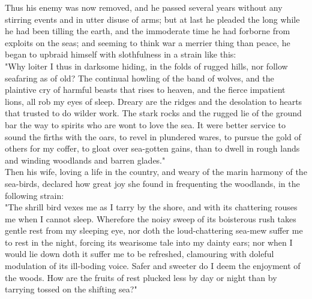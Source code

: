 \documentclass[10pt,a4paper]{report}
\begin{document}
Thus his enemy was now removed, and he passed several years without any stirring events and in utter disuse of arms; but at last he pleaded the long while he had been tilling the earth, and the immoderate time he had forborne from exploits on the seas; and seeming to think war a merrier thing than peace, he began to upbraid himself with slothfulness in a strain like this:\\

"Why loiter I thus in darksome hiding, in the folds of rugged hills, nor follow seafaring as of old? The continual howling of the band of wolves, and the plaintive cry of harmful beasts that rises to heaven, and the fierce impatient lions, all rob my eyes of sleep. Dreary are the ridges and the desolation to hearts that trusted to do wilder work. The stark rocks and the rugged lie of the ground bar the way to spirits who are wont to love the sea. It were better service to sound the firths with the oars, to revel in plundered wares, to pursue the gold of others for my coffer, to gloat over sea-gotten gains, than to dwell in rough lands and winding woodlands and barren glades."\\

Then his wife, loving a life in the country, and weary of the marin harmony of the sea-birds, declared how great joy she found in frequenting the woodlands, in the following strain:\\

"The shrill bird vexes me as I tarry by the shore, and with its chattering rouses me when I cannot sleep. Wherefore the noisy sweep of its boisterous rush takes gentle rest from my sleeping eye, nor doth the loud-chattering sea-mew suffer me to rest in the night, forcing its wearisome tale into my dainty ears; nor when I would lie down doth it suffer me to be refreshed, clamouring with doleful modulation of its ill-boding voice. Safer and sweeter do I deem the enjoyment of the woods. How are the fruits of rest plucked less by day or night than by tarrying tossed on the shifting sea?"\\
\end{document}
